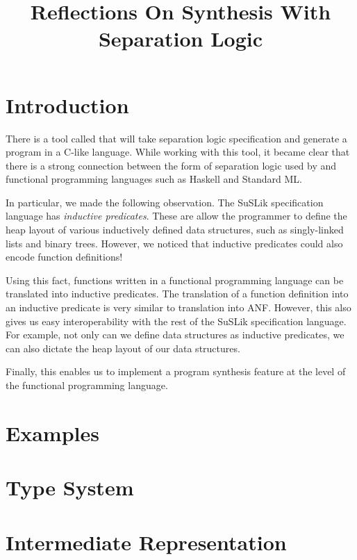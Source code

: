 \documentclass[runningheads]{llncs}
\begin{document}
\title{Reflections On Synthesis With Separation Logic}
\maketitle

\section{Introduction}

There is a tool called \SuSLik{} that will take separation logic specification and generate
a program in a C-like language. While working with this tool, it became clear that there is a strong
connection between the form of separation logic used by \SuSLik{} and functional programming languages such as Haskell and Standard ML.

In particular, we made the following observation. The SuSLik specification language has \textit{inductive predicates}. These are
allow the programmer to define the heap layout of various inductively defined data structures, such as singly-linked lists and binary trees.
However, we noticed that inductive predicates could also encode function definitions!

Using this fact, functions written in a functional programming language can be translated into inductive predicates. The translation
of a function definition into an inductive predicate is very similar to translation into ANF. However, this also gives us easy
interoperability with the rest of the SuSLik specification language. For example, not only can we define data structures as inductive
predicates, we can also dictate the heap layout of our data structures.

Finally, this enables us to implement a program synthesis feature at the level of the functional programming language.

\section{Examples}



\section{Type System}

\section{Intermediate Representation}
\end{document}
